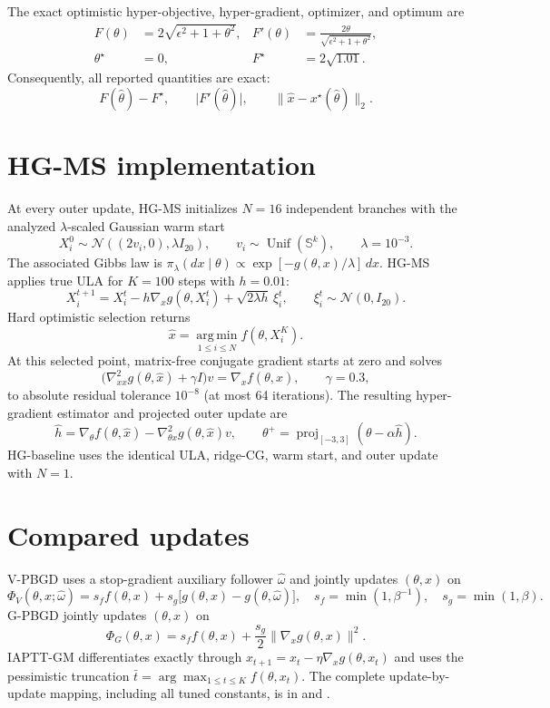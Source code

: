 \documentclass[10pt]{article}
\newcommand{\Sph}{\mathbb{S}}
\newcommand{\proj}{\operatorname{proj}}
\begin{document}


The exact optimistic hyper-objective, hyper-gradient, optimizer, and optimum
are
\[
\begin{aligned}
F(\theta)&=2\sqrt{\epsilon^2+1+\theta^2},&
F'(\theta)&=\frac{2\theta}{\sqrt{\epsilon^2+1+\theta^2}},\\
\theta^\star&=0,&
F^\star&=2\sqrt{1.01}.
\end{aligned}
\]
Consequently, all reported quantities are exact:
\[
F(\widehat\theta)-F^\star,\qquad
\lvert F'(\widehat\theta)\rvert,\qquad
\lVert\widehat x-x^\star(\widehat\theta)\rVert_2.
\]

\section{HG-MS implementation}

At every outer update, HG-MS initializes $N=16$ independent branches with the
analyzed $\lambda$-scaled Gaussian warm start
\[
X_i^0\sim\mathcal N((2v_i,0),\lambda I_{20}),\qquad
v_i\sim\operatorname{Unif}(\Sph^k),\qquad \lambda=10^{-3}.
\]
The associated Gibbs law is
$\pi_\lambda(dx\mid\theta)\propto
\exp[-g(\theta,x)/\lambda]\,dx$.  HG-MS applies true ULA for $K=100$ steps
with $h=0.01$:
\[
X_i^{t+1}
=X_i^t-h\nabla_xg(\theta,X_i^t)
+\sqrt{2\lambda h}\,\xi_i^t,\qquad
\xi_i^t\sim\mathcal N(0,I_{20}).
\]
Hard optimistic selection returns
\[
\widehat x=\operatorname*{arg\,min}_{1\leq i\leq N}
f(\theta,X_i^K).
\]
At this selected point, matrix-free conjugate gradient starts at zero and
solves
\[
\bigl(\nabla_{xx}^2g(\theta,\widehat x)+\gamma I\bigr)v
=\nabla_x f(\theta,\widehat x),\qquad \gamma=0.3,
\]
to absolute residual tolerance $10^{-8}$ (at most 64 iterations).  The
resulting hyper-gradient estimator and projected outer update are
\[
\widehat h
=\nabla_\theta f(\theta,\widehat x)
-\nabla_{\theta x}^2g(\theta,\widehat x)v,\qquad
\theta^+=\proj_{[-3,3]}(\theta-\alpha\widehat h).
\]
HG-baseline uses the identical ULA, ridge-CG, warm start, and outer update with
$N=1$.

\section{Compared updates}

V-PBGD uses a stop-gradient auxiliary follower $\widehat\omega$ and jointly
updates $(\theta,x)$ on
\[
\Phi_V(\theta,x;\widehat\omega)
=s_f f(\theta,x)+s_g
\bigl[g(\theta,x)-g(\theta,\widehat\omega)\bigr],
\quad s_f=\min(1,\beta^{-1}),\quad s_g=\min(1,\beta).
\]
G-PBGD jointly updates $(\theta,x)$ on
\[
\Phi_G(\theta,x)
=s_f f(\theta,x)+\frac{s_g}{2}\lVert\nabla_xg(\theta,x)\rVert^2.
\]
IAPTT-GM differentiates exactly through
$x_{t+1}=x_t-\eta\nabla_xg(\theta,x_t)$ and uses the pessimistic truncation
$\bar t=\arg\max_{1\leq t\leq K}f(\theta,x_t)$.  The complete update-by-update
mapping, including all tuned constants, is in
 and
.
\end{document}
